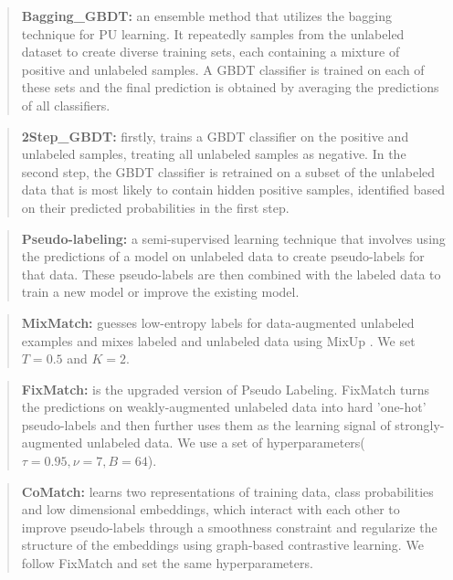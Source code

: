 \documentclass[10pt,journal,compsoc]{IEEEtran}
\begin{document}
\begin{quote}
	\textbf{Bagging\_GBDT:} an ensemble method that utilizes the bagging technique for PU learning. It repeatedly samples from the unlabeled dataset to create diverse training sets, each containing a mixture of positive and unlabeled samples. A GBDT classifier is trained on each of these sets and the final prediction is obtained by averaging the predictions of all classifiers.
\end{quote}

\begin{quote}
	\textbf{2Step\_GBDT:} firstly, trains a GBDT classifier on the positive and unlabeled samples, treating all unlabeled samples as negative. In the second step, the GBDT classifier is retrained on a subset of the unlabeled data that is most likely to contain hidden positive samples, identified based on their predicted probabilities in the first step.
\end{quote}

\begin{quote}
	\textbf{Pseudo-labeling:} a semi-supervised learning technique that involves using the predictions of a model on unlabeled data to create pseudo-labels for that data. These pseudo-labels are then combined with the labeled data to train a new model or improve the existing model.
\end{quote}

\begin{quote}
	\textbf{MixMatch:} guesses low-entropy labels for data-augmented unlabeled examples and mixes labeled and unlabeled data using MixUp \cite{zhang2017mixup}. We set $T = 0.5$ and $K = 2$.
\end{quote}

\begin{quote}
	\textbf{FixMatch:} is the upgraded version of Pseudo Labeling. FixMatch turns the predictions on weakly-augmented unlabeled data into hard 'one-hot' pseudo-labels and then further uses them as the learning signal of strongly-augmented unlabeled data. We use a set of hyperparameters($\tau = 0.95, \nu = 7, B = 64$).
\end{quote}

\begin{quote}
	\textbf{CoMatch:} learns two representations of training data, class probabilities and low dimensional embeddings, which interact with each other to improve pseudo-labels through a smoothness constraint and regularize the structure of the embeddings using graph-based contrastive learning. We follow FixMatch \cite{sohn2020fixmatch} and set the same hyperparameters.
\end{quote}
\end{document}
